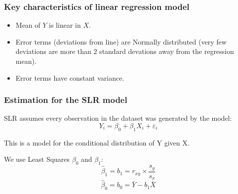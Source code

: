 \documentclass{beamer}
\newcommand{\bl}{\color{lightblue}}
\newcommand{\rd}{\color{burntorange}}
\newcommand{\bk}{\color{black}}
\newcommand{\mr}[1]{\mathrm{#1}}
\newcommand{\bi}{\begin{itemize}}
\newcommand{\ib}{\end{itemize}}
\newcommand{\p}{\item}
\newcommand{\sk}{\vspace{.5cm}}
\newcommand{\var}{\mr{var}}
\begin{document}

%
%



\begin{frame}
\frametitle{Key characteristics of linear regression model}


\bi
\p Mean of $Y$ is \bl linear \bk in $X$. \sk
\p Error terms (deviations from line) are \bl Normally distributed \bk 
(very few deviations are more than $2$ standard devations away from the regression mean). \sk
\p Error terms have \bl constant variance\bk.
\ib

\end{frame}


\begin{frame}
\frametitle{Estimation for the SLR model} 


SLR assumes every observation in the dataset was generated
by the model:
\[
Y_i = \beta_0 + \beta_1 X_i + \varepsilon_i
\]

\sk
This is a model for the conditional distribution of Y
given X.

\sk
We use Least Squares {\color{burntorange}{\it to estimate}} $\beta_0$ and $\beta_1$:
\[ \hat{\beta}_1 = b_1 = r_{xy} \times \frac{s_y}{s_x}  
\]
\[
\hat{\beta}_0 = b_0 =  \bar{Y} - b_1 \bar{X}
\]
\end{frame}


%


%
%
%
\end{document}
